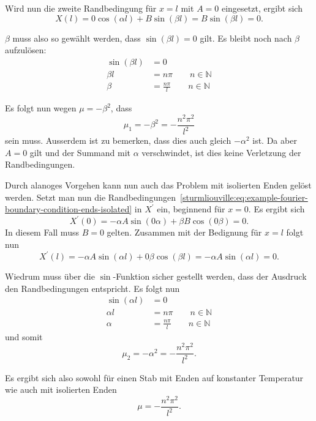 Wird nun die zweite Randbedingung für $x = l$ mit $A = 0$ eingesetzt, ergibt
sich
\[
    X(l)
    =
    0 \cos(\alpha l) + B \sin(\beta l)
    =
    B \sin(\beta l)
    = 0.
\]

$\beta$ muss also so gewählt werden, dass $\sin(\beta l) = 0$ gilt.
Es bleibt noch nach $\beta$ aufzulösen:
\[
\begin{aligned}
    \sin(\beta l) &= 0 \\
    \beta l &= n \pi \qquad n \in \mathbb{N} \\
    \beta &= \frac{n \pi}{l} \qquad n \in \mathbb{N}
\end{aligned}
\]

Es folgt nun wegen $\mu = -\beta^{2}$, dass
\[
    \mu_1 = -\beta^{2} = -\frac{n^{2}\pi^{2}}{l^{2}}
\]
sein muss.
Ausserdem ist zu bemerken, dass dies auch gleich $-\alpha^{2}$ ist.
Da aber $A = 0$ gilt und der Summand mit $\alpha$ verschwindet, ist dies keine
Verletzung der Randbedingungen.

Durch alanoges Vorgehen kann nun auch das Problem mit isolierten Enden gelöst
werden.
Setzt man nun die 
Randbedingungen~\eqref{sturmliouville:eq:example-fourier-boundary-condition-ends-isolated}
in $X^{\prime}$ ein, beginnend für $x = 0$. Es ergibt sich
\[
    X^{\prime}(0)
    =
    -\alpha A \sin(0 \alpha) + \beta B \cos(0 \beta)
    = 0.
\]
In diesem Fall muss $B = 0$ gelten.
Zusammen mit der Bedignung für $x = l$
folgt nun
\[
    X^{\prime}(l)
    =
    - \alpha A \sin(\alpha l) + 0 \beta \cos(\beta l)
    =
    - \alpha A \sin(\alpha l)
    = 0.
\]

Wiedrum muss über die $\sin$-Funktion sicher gestellt werden, dass der
Ausdruck den Randbedingungen entspricht.
Es folgt nun
\[
\begin{aligned}
    \sin(\alpha l) &= 0 \\
    \alpha l &= n \pi \qquad n \in \mathbb{N} \\
    \alpha &= \frac{n \pi}{l} \qquad n \in \mathbb{N}
\end{aligned}
\]
und somit
\[
    \mu_2 = -\alpha^{2} = -\frac{n^{2}\pi^{2}}{l^{2}}.
\]

Es ergibt sich also sowohl für einen Stab mit Enden auf konstanter Temperatur
wie auch mit isolierten Enden
\begin{equation}
    \label{sturmliouville:eq:example-fourier-mu-solution}
    \mu
    =
    -\frac{n^{2}\pi^{2}}{l^{2}}.
\end{equation}

%
%

